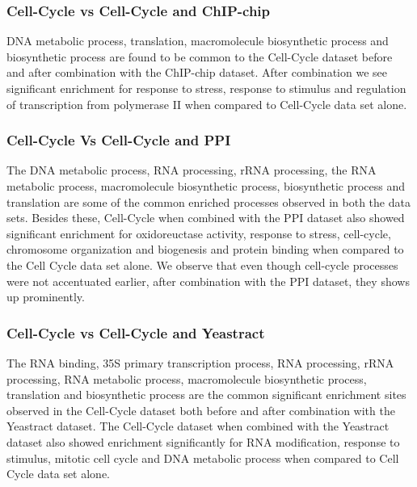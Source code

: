 \subsubsection{Cell-Cycle vs Cell-Cycle and ChIP-chip}

DNA metabolic process, translation, macromolecule biosynthetic process and biosynthetic process are found to be common to the Cell-Cycle dataset before and after combination with the 
ChIP-chip dataset. After combination we see significant enrichment for response to stress, response to stimulus and regulation of transcription from polymerase II when compared 
to Cell-Cycle data set alone.

\subsubsection{Cell-Cycle Vs Cell-Cycle and PPI}

The DNA metabolic process, RNA processing, rRNA processing, the RNA metabolic process, macromolecule biosynthetic process, biosynthetic process and translation are 
some of the common enriched processes observed in both the data sets. Besides these, Cell-Cycle when combined with the PPI dataset also showed significant enrichment for 
oxidoreuctase activity, response to stress, cell-cycle, chromosome organization and biogenesis and protein binding 
when compared to the Cell Cycle data set alone. We observe that even though
cell-cycle processes were not accentuated earlier, after combination with the PPI dataset, they shows up prominently. 

\subsubsection{Cell-Cycle vs Cell-Cycle and Yeastract}

The RNA binding, 35S primary transcription process, RNA processing, rRNA processing, RNA metabolic process, macromolecule biosynthetic process, 
translation and biosynthetic process are the common significant enrichment sites observed in the Cell-Cycle dataset both before and after combination with the Yeastract dataset. 
The Cell-Cycle dataset when combined with the Yeastract dataset also showed enrichment significantly for RNA modification, response to stimulus, mitotic cell cycle 
and DNA metabolic process when compared to Cell Cycle data set alone. 

